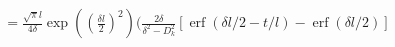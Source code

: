 \documentclass[a4paper]{article}
\newcommand{\erf}{\operatorname{erf}}
\begin{document}
\begin{multline}
  = 
  \frac{\sqrt{\pi}l}{4\delta}\exp\left(\left(\frac{\delta l}{2}\right)^2\right)
  \bigg(
  \frac{2 \delta}{\delta^2 - D_k^2}
  [\erf(\delta l / 2 - t/l) - \erf(\delta l / 2)]\\

\end{multline}
\end{document}
